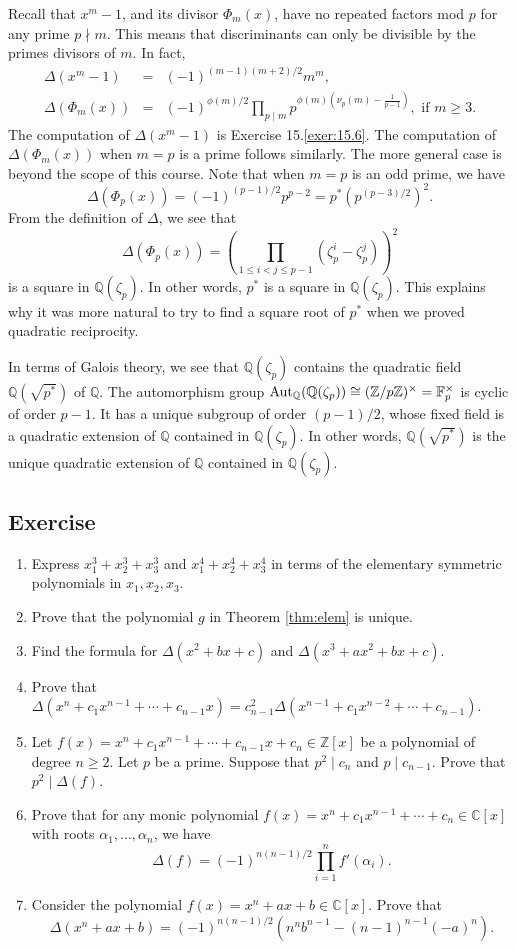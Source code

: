 \documentclass{article}
\def\Z{{\mathbb Z}}
\def\Aut{{\rm Aut}}
\def\F{{\mathbb F}}
\def\Q{{\mathbb Q}}
\def\Z{{\mathbb Z}}
\def\F{{\mathbb F}}
\def\Q{{\mathbb Q}}
\def\C{{\mathbb C}}
\begin{document}
Recall that $x^m - 1$, and its divisor $\Phi_m(x)$, have no repeated factors mod $p$ for any prime $p\nmid m$. This means that discriminants can only be divisible by the primes divisors of $m$. In fact,
\begin{eqnarray*}
    \Delta(x^m - 1) &=& (-1)^{(m-1)(m+2)/2}m^m,\\
    \Delta(\Phi_m(x)) &=& (-1)^{\phi(m)/2}\prod_{p\mid m}p^{\phi(m)(\nu_p(m) - \frac{1}{p-1})},\mbox{ if }m\geq3.
\end{eqnarray*}
The computation of $\Delta(x^m - 1)$ is Exercise 15.\ref{exer:15.6}. The computation of $\Delta(\Phi_m(x))$ when $m = p$ is a prime follows similarly. The more general case is beyond the scope of this course.
Note that when $m = p$ is an odd prime, we have
$$\Delta(\Phi_p(x)) = (-1)^{(p-1)/2}p^{p-2} = p^*(p^{(p-3)/2})^2.$$
From the definition of $\Delta$, we see that
$$\Delta(\Phi_p(x)) = \left(\prod_{1\leq i < j \leq p-1}(\zeta_p^i - \zeta_p^j)\right)^2$$
is a square in $\Q(\zeta_p)$. In other words, $p^*$ is a square in $\Q(\zeta_p)$. This explains why it was more natural to try to find a square root of $p^*$ when we proved quadratic reciprocity. 

In terms of Galois theory, we see that $\Q(\zeta_p)$ contains the quadratic field $\Q(\sqrt{p^*})$ of $\Q$. The automorphism group $\Aut_\Q(\Q(\zeta_p))\cong(\Z/p\Z)^\times = \F_p^\times$ is cyclic of order $p-1$. It has a unique subgroup of order $(p-1)/2$, whose fixed field is a quadratic extension of $\Q$ contained in $\Q(\zeta_p)$. In other words, $\Q(\sqrt{p^*})$ is the unique quadratic extension of $\Q$ contained in $\Q(\zeta_p)$. 

\subsection*{Exercise}
\begin{enumerate}[\thesection .1]
    \item Express $x_1^3 + x_2^3 + x_3^3$ and $x_1^4 + x_2^4 + x_3^4$ in terms of the elementary symmetric polynomials in $x_1, x_2, x_3$.
    \item Prove that the polynomial $g$ in Theorem \ref{thm:elem} is unique.
    \item Find the formula for $\Delta(x^2 + bx + c)$ and $\Delta(x^3 + ax^2 + bx + c).$
    \item Prove that $\Delta(x^n + c_1x^{n-1} + \cdots + c_{n-1}x) = c_{n-1}^2\Delta(x^{n-1} + c_1x^{n-2} + \cdots + c_{n-1})$.
    \item Let $f(x) = x^n + c_1x^{n-1} + \cdots + c_{n-1}x + c_n\in\Z[x]$ be a polynomial of degree $n\geq 2$. Let $p$ be a prime. Suppose that $p^2\mid c_n$ and $p\mid c_{n-1}$. Prove that $p^2\mid\Delta(f)$.
    \item Prove that for any monic polynomial $f(x) = x^n + c_1x^{n-1} + \cdots + c_n\in\C[x]$ with roots $\alpha_1,\ldots,\alpha_n$, we have $$\Delta(f) = (-1)^{n(n-1)/2}\prod_{i=1}^n f'(\alpha_i).$$
    \item Consider the polynomial $f(x) = x^n + ax + b\in\C[x]$. Prove that 
    $$\Delta(x^n + ax + b) = (-1)^{n(n-1)/2}(n^nb^{n-1} - (n-1)^{n-1}(-a)^n).$$
\end{enumerate}
\end{document}
